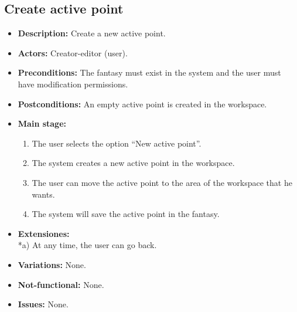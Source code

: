 \subsection{Create active point}
\begin{itemize}
	\item \textbf{Description:} Create a new active point.
	\item \textbf{Actors:} Creator-editor (user).
	\item \textbf{Preconditions:} The fantasy must exist in the system and the user must have modification permissions.
	\item \textbf{Postconditions:} An empty active point is created in the workspace.
	\item \textbf{Main stage:}
	\begin{enumerate}
		\item The user selects the option ``New active point''.
		\item The system creates a new active point in the workspace.
		\item The user can move the active point to the area of the workspace that he wants.
		\item The system will save the active point in the fantasy.
	\end{enumerate}
	\item \textbf{Extensiones:} \\ *a) At any time, the user can go back.
	\item \textbf{Variations:} None.
	\item \textbf{Not-functional:} None.
	\item \textbf{Issues:} None.
\end{itemize}

